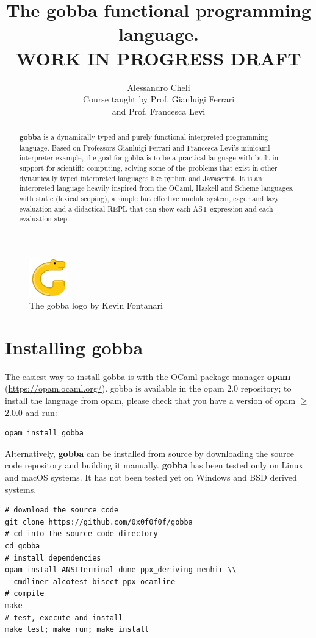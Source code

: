\documentclass[a4paper, 10pt]{article}
\title{The gobba functional programming language.\\WORK IN PROGRESS DRAFT}
\author{Alessandro Cheli\\Course taught by Prof. Gianluigi Ferrari\\and Prof. Francesca Levi}
\theoremstyle{plain}%
\theoremstyle{definition}
\theoremstyle{remark}
\begin{document}
\maketitle

\begin{figure}[htbp!]
	\centering
	\includegraphics[width=0.15\textwidth]{../assets/gobba.png}
	\captionsetup{labelformat=empty}
	\caption{The gobba logo by Kevin Fontanari}
\end{figure}

\begin{abstract}
\textbf{gobba} is a dynamically typed and purely functional interpreted
programming language. Based on Professors Gianluigi Ferrari and Francesca Levi's
minicaml interpreter example, the goal for gobba is to be a practical language with
built in support for scientific computing, solving some of the problems that
exist in other dynamically typed interpreted languages like python and Javascript. It is an
interpreted language heavily inspired from the OCaml, Haskell and Scheme
languages, with static (lexical scoping), a simple but effective module system,
eager and lazy evaluation and a didactical REPL that can show each AST
expression and each evaluation step.
\end{abstract}

\section{Installing gobba}

The easiest way to install gobba is with the
OCaml package manager \textbf{opam} (\url{https://opam.ocaml.org/}). gobba is available in the opam 2.0 repository; to install the language from opam, please check that you have a version of opam $\geq$
2.0.0 and run:
\begin{lstlisting}[style=bash]
opam install gobba
\end{lstlisting}
Alternatively, \textbf{gobba} can be installed from source by downloading the
source code repository and building it manually. \textbf{gobba} has been tested
only on Linux and macOS systems. It has not been tested yet on Windows and BSD
derived systems.
\begin{lstlisting}[style=bash]
# download the source code
git clone https://github.com/0x0f0f0f/gobba
# cd into the source code directory
cd gobba
# install dependencies
opam install ANSITerminal dune ppx_deriving menhir \\
  cmdliner alcotest bisect_ppx ocamline
# compile
make
# test, execute and install
make test; make run; make install
\end{lstlisting}
\end{document}
